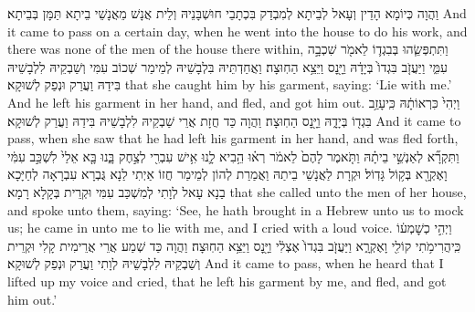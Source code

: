 {וַהֲוָה כְּיוֹמָא הָדֵין וְעָאל לְבֵיתָא לְמִבְדַק בִּכְתָבֵי חוּשְׁבָּנֵיהּ וְלֵית אֲנָשׁ מֵאֲנָשֵׁי בֵיתָא תַּמָּן בְּבֵיתָא׃}
{And it came to pass on a certain day, when he went into the house to do his work, and there was none of the men of the house there within,}{}
{וַתִּתְפְּשֵׂ֧הוּ בְּבִגְד֛וֹ לֵאמֹ֖ר שִׁכְבָ֣ה עִמִּ֑י וַיַּעֲזֹ֤ב בִּגְדוֹ֙ בְּיָדָ֔הּ וַיָּ֖נׇס וַיֵּצֵ֥א הַחֽוּצָה׃}
{וַאֲחַדְתֵּיהּ בִּלְבָשֵׁיהּ לְמֵימַר שְׁכוֹב עִמִּי וְשַׁבְקֵיהּ לִלְבָשֵׁיהּ בִּידַהּ וַעֲרַק וּנְפַק לְשׁוּקָא׃}
{that she caught him by his garment, saying: ‘Lie with me.’ And he left his garment in her hand, and fled, and got him out.}{}
{וַיְהִי֙ כִּרְאוֹתָ֔הּ כִּֽי\maqqaf עָזַ֥ב בִּגְד֖וֹ בְּיָדָ֑הּ וַיָּ֖נׇס הַחֽוּצָה׃}
{וַהֲוָה כַּד חֲזָת אֲרֵי שַׁבְקֵיהּ לִלְבָשֵׁיהּ בִּידַהּ וַעֲרַק לְשׁוּקָא׃}
{And it came to pass, when she saw that he had left his garment in her hand, and was fled forth,}{}
{וַתִּקְרָ֞א לְאַנְשֵׁ֣י בֵיתָ֗הּ וַתֹּ֤אמֶר לָהֶם֙ לֵאמֹ֔ר רְא֗וּ הֵ֥בִיא לָ֛נוּ אִ֥ישׁ עִבְרִ֖י לְצַ֣חֶק בָּ֑נוּ בָּ֤א אֵלַי֙ לִשְׁכַּ֣ב עִמִּ֔י וָאֶקְרָ֖א בְּק֥וֹל גָּדֽוֹל׃}
{וּקְרָת לַאֲנָשֵׁי בֵיתַהּ וַאֲמַרַת לְהוֹן לְמֵימַר חֲזוֹ אַיְתִי לַנָא גֻּבְרָא עִבְרָאָה לְחַיָּכָא בַנָא עָאל לְוָתִי לְמִשְׁכַּב עִמִּי וּקְרֵית בְּקָלָא רָמָא׃}
{that she called unto the men of her house, and spoke unto them, saying: ‘See, he hath brought in a Hebrew unto us to mock us; he came in unto me to lie with me, and I cried with a loud voice.}{}
{וַיְהִ֣י כְשׇׁמְע֔וֹ כִּֽי\maqqaf הֲרִימֹ֥תִי קוֹלִ֖י וָאֶקְרָ֑א וַיַּעֲזֹ֤ב בִּגְדוֹ֙ אֶצְלִ֔י וַיָּ֖נׇס וַיֵּצֵ֥א הַחֽוּצָה׃}
{וַהֲוָה כַּד שְׁמַע אֲרֵי אֲרֵימִית קָלִי וּקְרֵית וְשַׁבְקֵיהּ לִלְבָשֵׁיהּ לְוָתִי וַעֲרַק וּנְפַק לְשׁוּקָא׃}
{And it came to pass, when he heard that I lifted up my voice and cried, that he left his garment by me, and fled, and got him out.’}{}
